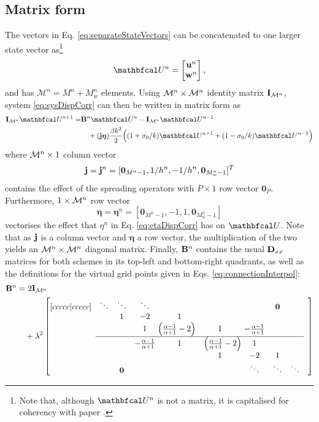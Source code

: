 \subsection{Matrix form}
The vectors in Eq. \eqref{eq:separateStateVectors} can be concatenated to one larger state vector as\footnote{Note that, although $\Ucal^n$ is not a matrix, it is capitalised for coherency with paper \citeP[G].}
\begin{equation}\label{eq:fullState}
    \Ucal^n = \begin{bmatrix}
        \mathbf{u}^n \\
        \mathbf{w}^n
    \end{bmatrix},
\end{equation}
and has $\mathcal{M}^n = M^n+M_w^n$ elements. 
Using ${\mathcal{M}^n} \times {\mathcal{M}^n}$ identity matrix $\mathbf{I}_{\mathcal{M}^n}$, system \eqref{eq:sysDispCorr} can then be written in matrix form as
\begin{equation}\label{eq:intermediateMatrixFormDynamic}
    \begin{aligned}
        \I_\fullMn\Ucal^{n+1} = &\B^n\Ucal^n - \I_\fullMn\Ucal^{n-1} \\
        &\quad+ (\j\boldsymbol{\eta})\frac{\beta k^2}{2}\Big((1+\sigma_0/k)\Ucal^{n+1} + (1-\sigma_0/k)\Ucal^{n-1}\Big)
    \end{aligned}
\end{equation}
where ${\mathcal{M}^n} \times 1$ column vector
\begin{equation*}
    \mathbf{j} = \mathbf{j}^n = [\mathbf{0}_{M^n-1}, 1/h^n, -1/h^n, \mathbf{0}_{M_w^n-1}]^T
\end{equation*}
contains the effect of the spreading operators with $P\times 1$ row vector $\mathbf{0}_P$. Furthermore, $1\times {\mathcal{M}^n}$ row vector
\begin{equation*}
    \boldsymbol{\eta} = \boldsymbol{\eta}^n = [\mathbf{0}_{M^n-1}, -1, 1, \mathbf{0}_{M_w^n-1}]
\end{equation*}
vectorises the effect that $\eta^n$ in Eq. \eqref{eq:etaDispCorr} has on $\Ucal$. Note that as $\mathbf{j}$ is a column vector and $\boldsymbol{\eta}$ a row vector, the multiplication of the two yields an ${\mathcal{M}^n}\times{\mathcal{M}^n}$ diagonal matrix. Finally, $\mathbf{B}^n$ contains the usual $\mathbf{D}_{xx}$ matrices for both schemes in its top-left and bottom-right quadrants, as well as the definitions for the virtual grid points given in Eqs. \eqref{eq:connectionInterpol}:
\begin{align*}
    \mathbf{B}^n= &\ 2\I_\fullMn \\
    &+ \lambda^2\begin{bmatrix}[ccccc|ccccc]
     & \ddots& \ddots  &\ddots & & & & \mathbf{0} & & \\
      & & 1 & -2 & 1 & & & & & \\
     & & & 1 & \!\!\!\!\left(\frac{\alpha - 1}{\alpha + 1} -2\right)& 1 & -\frac{\alpha - 1}{\alpha + 1} & & \\ \cline{2-9}
     & & & -\frac{\alpha - 1}{\alpha + 1} & 1 & \left(\frac{\alpha - 1}{\alpha + 1} -2\right)\!\!\!\! & 1 & & & \\
        & & & & &1 & -2 & 1 & & \\
       & & \mathbf{0} & & &  &\ddots & \ddots &\ddots &
    \end{bmatrix}
\end{align*}
